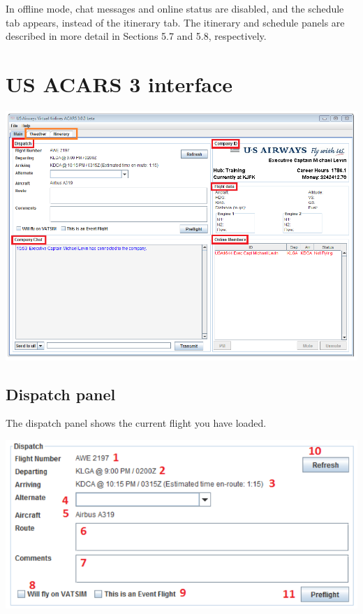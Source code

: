 \documentclass[12pt]{article}
\begin{document}
In offline mode, chat messages and online status are disabled, and the schedule tab appears, instead of the itinerary tab. The itinerary and schedule panels are described in more detail in Sections 5.7 and 5.8, respectively.

\section{US ACARS 3 interface}

\begin{center}
\includegraphics[scale=1]{Image5.pdf}
\end{center}

\subsection{Dispatch panel}
The dispatch panel shows the current flight you have loaded.

\begin{center}
\includegraphics[scale=1]{Image6.pdf}
\end{center} 
\end{document}
